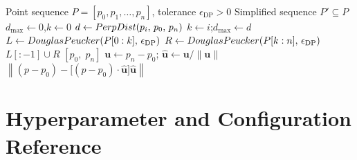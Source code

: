 \documentclass[12pt, a4paper, oneside]{report}
\theoremstyle{definition}
\newcommand{\norm}[1]{\left\|#1\right\|}
\begin{document}
\begin{algorithm}[H]
\caption{Douglas--Peucker Path Simplification}
\label{alg:dp}
\begin{algorithmic}[1]
\Require Point sequence $P = [p_0, p_1, \ldots, p_n]$,
         tolerance $\epsilon_{\mathrm{DP}} > 0$
\Ensure Simplified sequence $P' \subseteq P$
  \State $d_{\max} \gets 0$,\quad $k \gets 0$
    \State $d \gets PerpDist(p_i,\, p_0,\, p_n)$
      \State $k \gets i$;\quad $d_{\max} \gets d$
    \EndIf
  \EndFor
    \State $L \gets DouglasPeucker(P[0:k],\,\epsilon_{\mathrm{DP}})$
    \State $R \gets DouglasPeucker(P[k:n],\,\epsilon_{\mathrm{DP}})$
    \State \Return $L[:-1] \cup R$
  \Else
    \State \Return $[p_0,\; p_n]$
  \EndIf
\EndFunction
\Statex
{}
  \State $\mathbf{u} \gets p_n - p_0$;\quad
         $\hat{\mathbf{u}} \gets \mathbf{u}/\norm{\mathbf{u}}$
  \State \Return $\norm{(p - p_0) -
         \bigl[(p-p_0)\cdot\hat{\mathbf{u}}\bigr]\hat{\mathbf{u}}}$
\EndFunction
\end{algorithmic}
\end{algorithm}

\chapter{Hyperparameter and Configuration Reference}
\label{app:hyperparams}
\end{document}
